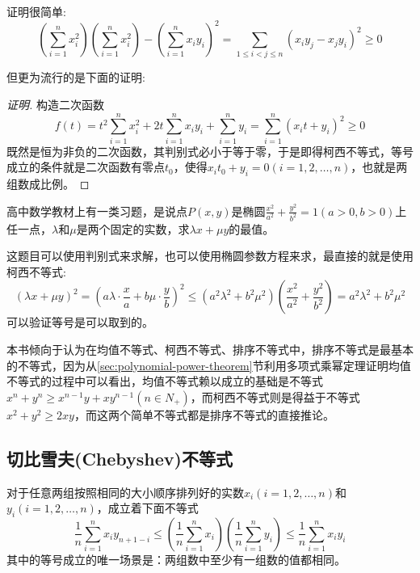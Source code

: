 证明很简单:
\begin{equation*}
  \left( \sum_{i=1}^nx_i^2 \right) \left( \sum_{i=1}^nx_i^2 \right) - \left( \sum_{i=1}^nx_iy_i \right)^2 = \sum_{1 \leqslant i < j \leqslant n}(x_iy_j-x_jy_i)^2 \geqslant 0
\end{equation*}

但更为流行的是下面的证明:

\begin{proof}[证明]
  构造二次函数
  \begin{equation*}
  f(t)=t^2\sum_{i=1}^nx_i^2+2t\sum_{i=1}^nx_iy_i+\sum_{i=1}^ny_i=\sum_{i=1}^n(x_it+y_i)^2 \geqslant 0
  \end{equation*}
 既然是恒为非负的二次函数，其判别式必小于等于零，于是即得柯西不等式，等号成立的条件就是二次函数有零点$t_0$，使得$x_it_0+y_i=0(i=1,2,\ldots,n)$，也就是两组数成比例。
\end{proof}

\begin{example}
  高中数学教材上有一类习题，是说点$P(x,y)$是椭圆$\frac{x^2}{a^2}+\frac{y^2}{b^2}=1(a>0, b>0)$上任一点，$\lambda$和$\mu$是两个固定的实数，求$\lambda x + \mu y$的最值。

  这题目可以使用判别式来求解，也可以使用椭圆参数方程来求，最直接的就是使用柯西不等式:
  \begin{equation*}
    (\lambda x + \mu y)^2 = (a\lambda \cdot \frac{x}{a} + b\mu \cdot \frac{y}{b})^2 \leqslant (a^2\lambda^2+b^2\mu^2)(\frac{x^2}{a^2}+\frac{y^2}{b^2}) = a^2\lambda^2+b^2\mu^2
  \end{equation*}
  可以验证等号是可以取到的。
\end{example}

本书倾向于认为在均值不等式、柯西不等式、排序不等式中，排序不等式是最基本的不等式，因为从\ref{sec:polynomial-power-theorem}节利用多项式乘幂定理证明均值不等式的过程中可以看出，均值不等式赖以成立的基础是不等式$x^n+y^n \geqslant x^{n-1}y+xy^{n-1}(n \in N_+)$，而柯西不等式则是得益于不等式$x^2+y^2 \geqslant 2xy$，而这两个简单不等式都是排序不等式的直接推论。

\subsection{切比雪夫(Chebyshev)不等式}

\begin{theorem}[切比雪夫不等式]
对于任意两组按照相同的大小顺序排列好的实数$x_i(i=1,2,\ldots,n)$和$y_i(i=1,2,\ldots,n)$，成立着下面不等式
\begin{equation}
  \label{eq:chebyshev-inequation}
  \frac{1}{n}\sum_{i=1}^nx_iy_{n+1-i}
  \leqslant \left( \frac{1}{n}\sum_{i=1}^nx_i \right) \left( \frac{1}{n}\sum_{i=1}^ny_i \right)
  \leqslant \frac{1}{n}\sum_{i=1}^nx_iy_i
\end{equation}
其中的等号成立的唯一场景是：两组数中至少有一组数的值都相同。
\end{theorem}

